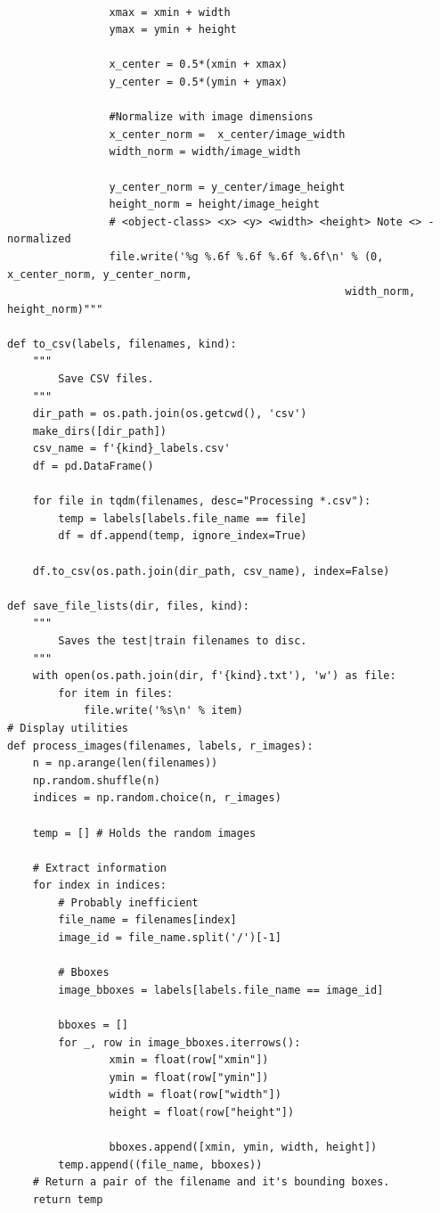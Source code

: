 \documentclass[12pt]{report}
\begin{document}
\begin{lstlisting}
                   
                xmax = xmin + width
                ymax = ymin + height

                x_center = 0.5*(xmin + xmax)
                y_center = 0.5*(ymin + ymax)

                #Normalize with image dimensions
                x_center_norm =  x_center/image_width
                width_norm = width/image_width

                y_center_norm = y_center/image_height
                height_norm = height/image_height
                # <object-class> <x> <y> <width> <height> Note <> - normalized
                file.write('%g %.6f %.6f %.6f %.6f\n' % (0, x_center_norm, y_center_norm,
                                                     width_norm, height_norm)"""
              
def to_csv(labels, filenames, kind):
    """
        Save CSV files.
    """
    dir_path = os.path.join(os.getcwd(), 'csv')
    make_dirs([dir_path])
    csv_name = f'{kind}_labels.csv'
    df = pd.DataFrame()
    
    for file in tqdm(filenames, desc="Processing *.csv"):
        temp = labels[labels.file_name == file]
        df = df.append(temp, ignore_index=True)
        
    df.to_csv(os.path.join(dir_path, csv_name), index=False)

def save_file_lists(dir, files, kind):
    """
        Saves the test|train filenames to disc.
    """
    with open(os.path.join(dir, f'{kind}.txt'), 'w') as file:
        for item in files:
            file.write('%s\n' % item)
# Display utilities
def process_images(filenames, labels, r_images):
    n = np.arange(len(filenames))
    np.random.shuffle(n)
    indices = np.random.choice(n, r_images)
    
    temp = [] # Holds the random images
    
    # Extract information
    for index in indices:
        # Probably inefficient
        file_name = filenames[index]
        image_id = file_name.split('/')[-1]
        
        # Bboxes
        image_bboxes = labels[labels.file_name == image_id]
        
        bboxes = []
        for _, row in image_bboxes.iterrows():
                xmin = float(row["xmin"])
                ymin = float(row["ymin"])
                width = float(row["width"])
                height = float(row["height"])
                
                bboxes.append([xmin, ymin, width, height])
        temp.append((file_name, bboxes))
    # Return a pair of the filename and it's bounding boxes.
    return temp


\end{lstlisting}
\end{document}
